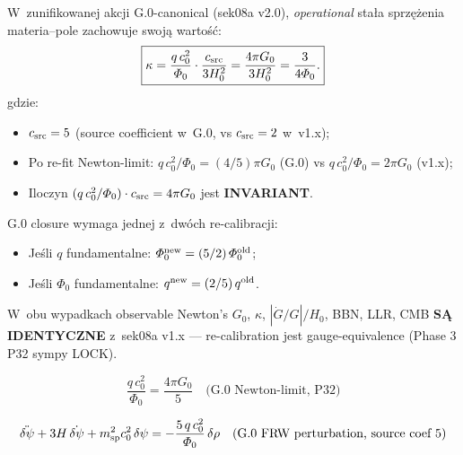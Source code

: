\begin{proposition}%
\label{prop:kappa-corrected-G0}
W~zunifikowanej akcji G.0-canonical (sek08a v2.0), \emph{operational}
sta\l{}a sprz\k{e}\.zenia materia--pole zachowuje swoj\k{a} warto\'s\'c:
\begin{equation}\label{eq:kappa-corrected-G0}
  \boxed{
    \kappa = \frac{q\,c_0^2}{\Phi_0}\cdot\frac{c_{\rm src}}{3 H_0^2}
    = \frac{4\pi G_0}{3 H_0^2}
    = \frac{3}{4\Phi_0}.
  }
\end{equation}
gdzie:
\begin{itemize}[nosep]
  \item $c_{\rm src} = 5$ (source coefficient w~G.0, vs $c_{\rm src} = 2$
    w~v1.x);
  \item Po re-fit Newton-limit: $q\,c_0^2/\Phi_0 = (4/5)\pi G_0$ (G.0)
    vs $q\,c_0^2/\Phi_0 = 2\pi G_0$ (v1.x);
  \item Iloczyn $(q\,c_0^2/\Phi_0)\cdot c_{\rm src} = 4\pi G_0$
    jest \textbf{INVARIANT}.
\end{itemize}
\end{proposition}

\begin{remark}%
\label{rem:Phi0-refit-G0}
G.0 closure wymaga jednej z~dwóch re-calibracji:
\begin{itemize}[nosep]
  \item Je\'sli $q$ fundamentalne: $\Phi_0^{\rm new} = (5/2)\,\Phi_0^{\rm old}$;
  \item Je\'sli $\Phi_0$ fundamentalne: $q^{\rm new} = (2/5)\,q^{\rm old}$.
\end{itemize}
W~obu wypadkach observable Newton's $G_0$, $\kappa$, $|\dot G/G|/H_0$,
BBN, LLR, CMB \textbf{S\k{A} IDENTYCZNE} z~sek08a v1.x ---
re-calibration jest gauge-equivalence (Phase 3 P32 sympy LOCK).
\end{remark}

\begin{equation}\label{eq:newton-limit-G0}
  \boxed{
    \frac{q\,c_0^2}{\Phi_0} = \frac{4\pi G_0}{5}
    \quad \text{(G.0 Newton-limit, P32)}
  }
\end{equation}

\begin{equation}\label{eq:cosmo-linearized-unified-G0}
  \ddot{\delta\psi} + 3H\,\dot{\delta\psi}
  + m_{\rm sp}^2 c_0^2\,\delta\psi
  = -\frac{5\,q\,c_0^2}{\Phi_0}\,\delta\rho
  \quad \text{(G.0 FRW perturbation, source coef 5)}
\end{equation}

